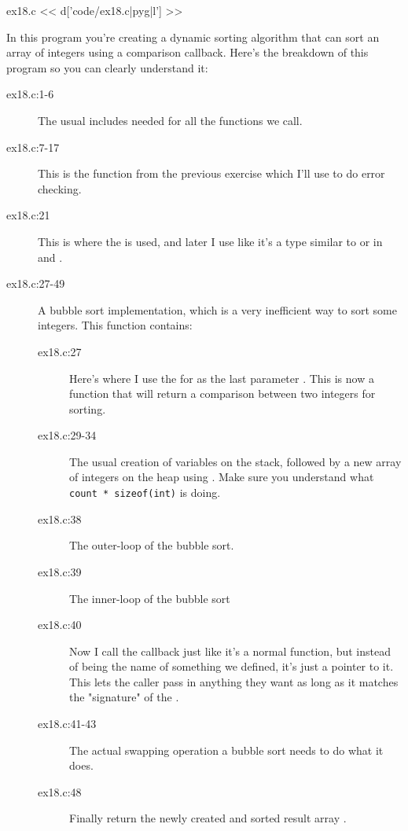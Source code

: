 \begin{code}{ex18.c}
<< d['code/ex18.c|pyg|l'] >>
\end{code}

In this program you're creating a dynamic sorting algorithm that can sort
an array of integers using a comparison callback.  Here's the breakdown
of this program so you can clearly understand it:

\begin{description}
\item[ex18.c:1-6] The usual includes needed for all the functions we call.
\item[ex18.c:7-17] This is the  function from the previous exercise
    which I'll use to do error checking.
\item[ex18.c:21] This is where the  is used, and later I use 
     like it's a type similar to  or 
     in  and .
\item[ex18.c:27-49] A bubble sort implementation, which is a very inefficient way
    to sort some integers.  This function contains:
    \begin{description}
    \item[ex18.c:27] Here's where I use the  for 
        as the last parameter .  This is now a function that will
        return a comparison between two integers for sorting.
    \item[ex18.c:29-34] The usual creation of variables on the stack, followed by
    a new array of integers on the heap using .  Make sure you
    understand what \verb|count * sizeof(int)| is doing.
    \item[ex18.c:38] The outer-loop of the bubble sort.
    \item[ex18.c:39] The inner-loop of the bubble sort
    \item[ex18.c:40] Now I call the  callback just like it's a normal
        function, but instead of being the name of something we defined, 
        it's just a pointer to it.  This lets the caller pass in anything
        they want as long as it matches the "signature" of the 
        .
    \item[ex18.c:41-43] The actual swapping operation a bubble sort needs to do what it
        does.
    \item[ex18.c:48] Finally return the newly created and sorted result array .

\end{description}
\end{description}
